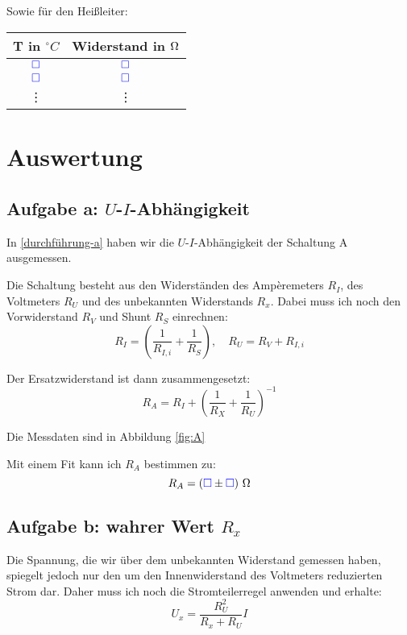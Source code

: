 \documentclass[11pt, ngerman]{article}
\newcommand{\messwert}{\textcolor{blue}{\square}}
\newcommand{\emesswert}{\left(\messwert \pm \messwert \right)}
\begin{document}
Sowie für den Heißleiter:

\begin{center}
	\begin{tabular}{cc}
		T in $\unit{^\circ C}$ & Widerstand in $\unit \Omega$ \\
		\hline
		$\messwert$ & $\messwert$ \\
		$\messwert$ & $\messwert$ \\
		   \vdots & \vdots
	\end{tabular}
\end{center}


\section{Auswertung}

\subsection{Aufgabe a: $U$-$I$-Abhängigkeit}

\label{auswertung-a}

In \ref{durchführung-a} haben wir die $U$-$I$-Abhängigkeit der Schaltung A ausgemessen.

Die Schaltung besteht aus den Widerständen des Ampèremeters $R_I$, des Voltmeters $R_U$ und des unbekannten Widerstands $R_x$. Dabei muss ich noch den Vorwiderstand $R_V$ und Shunt $R_S$ einrechnen:
\[
	R_I = \left( \frac 1{R_{I, i}} + \frac 1{R_S}  \right),
	\quad
	R_U = R_V + R_{I, i}
\]

Der Ersatzwiderstand ist dann zusammengesetzt:
\[ R_A = R_I + \left( \frac{1}{R_X} + \frac 1{R_U} \right)^{-1} \]

Die Messdaten sind in Abbildung \ref{fig:A}

Mit einem Fit kann ich $R_A$ bestimmen zu:
\[ R_A = \unit[\emesswert] \Omega \]

\subsection{Aufgabe b: wahrer Wert $R_x$}

\label{auswertung-b}

Die Spannung, die wir über dem unbekannten Widerstand gemessen haben, spiegelt jedoch nur den um den Innenwiderstand des Voltmeters reduzierten Strom dar. Daher muss ich noch die Stromteilerregel anwenden und erhalte:
\[ U_x = \frac{R_U^2}{R_x + R_U} I \]
\end{document}
